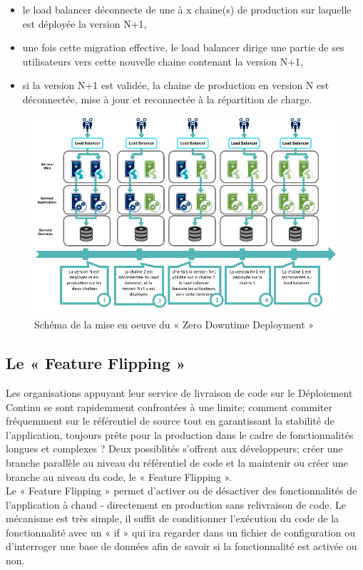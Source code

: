         \begin{itemize}
          \item le load balancer déconnecte de une à x chaine(s) de production sur laquelle est déployée la version N+1,
          \item une fois cette migration effective, le load balancer dirige une partie de ses utilisateurs vers cette nouvelle chaine contenant la version N+1,
          \item si la version N+1 est validée, la chaine de production en version N est déconnectée, mise à jour et reconnectée à la répartition de charge.\\
        \end{itemize}

        \begin{figure}
          \begin{center}
            \includegraphics[scale=0.6]{images/LoadBalancer.png}
          \end{center}
          \caption{Schéma de la mise en oeuve du « Zero Downtime Deployment »}
          \label{LoadBalancer}
        \end{figure}

      \subsection{Le « Feature Flipping »}
      Les organisations appuyant leur service de livraison de code sur le Déploiement Continu se sont rapidemment confrontées à une limite; comment commiter fréquemment sur le référentiel de source tout en garantissant la stabilité de l’application, toujours prête pour la production dans le cadre de fonctionnalités longues et complexes ? Deux possiblités s'offrent aux développeurs; créer une branche parallèle au niveau du référentiel de code et la maintenir ou créer une branche au niveau du code, le « Feature Flipping ».\\
      Le « Feature Flipping » permet d'activer ou de désactiver des fonctionnalités de l'application à chaud - directement en production sans relivraison de code. Le mécanisme est très simple, il suffit de conditionner l'exécution du code de la fonctionnalité avec un « if » qui ira regarder dans un fichier de configuration ou d'interroger une base de données afin de savoir si la fonctionnalité est activée ou non.\\

